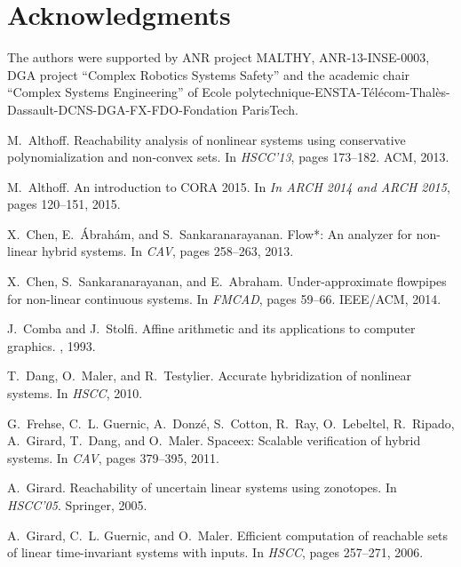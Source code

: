 \documentclass{sig-alternate-05-2015}
\begin{document}
\section{Acknowledgments}
The authors were supported by ANR project MALTHY, ANR-13-INSE-0003, DGA project ``Complex Robotics Systems Safety'' and the academic chair ``Complex Systems Engineering''
of Ecole polytechnique-ENS\-TA-T\'el\'ecom-Thal\`es-Dassault-DCNS-DGA-FX-FDO-Fondation ParisTech.

%
%

\begin{thebibliography}{10}

M.~Althoff.
\newblock Reachability analysis of nonlinear systems using conservative
  polynomialization and non-convex sets.
\newblock In {\em HSCC'13}, pages 173--182. ACM, 2013.

M.~Althoff.
\newblock An introduction to {CORA} 2015.
\newblock In {\em In ARCH 2014 and ARCH 2015}, pages 120--151, 2015.

X.~Chen, E.~{\'{A}}brah{\'{a}}m, and S.~Sankaranarayanan.
\newblock Flow*: An analyzer for non-linear hybrid systems.
\newblock In {\em CAV}, pages 258--263, 2013.

X.~Chen, S.~Sankaranarayanan, and E.~Abraham.
\newblock Under-approximate flowpipes for non-linear continuous systems.
\newblock In {\em FMCAD}, pages 59--66. IEEE/ACM, 2014.

J.~Comba and J.~Stolfi.
\newblock Affine arithmetic and its applications to computer graphics.
, 1993.

T.~Dang, O.~Maler, and R.~Testylier.
\newblock Accurate hybridization of nonlinear systems.
\newblock In {\em HSCC}, 2010.

G.~Frehse, C.~L. Guernic, A.~Donz{\'{e}}, S.~Cotton, R.~Ray, O.~Lebeltel,
  R.~Ripado, A.~Girard, T.~Dang, and O.~Maler.
\newblock Spaceex: Scalable verification of hybrid systems.
\newblock In {\em CAV}, pages 379--395, 2011.

A.~Girard.
\newblock Reachability of uncertain linear systems using zonotopes.
\newblock In {\em HSCC'05}. Springer, 2005.

A.~Girard, C.~L. Guernic, and O.~Maler.
\newblock Efficient computation of reachable sets of linear time-invariant
  systems with inputs.
\newblock In {\em HSCC}, pages 257--271, 2006.


\end{thebibliography}
\end{document}
